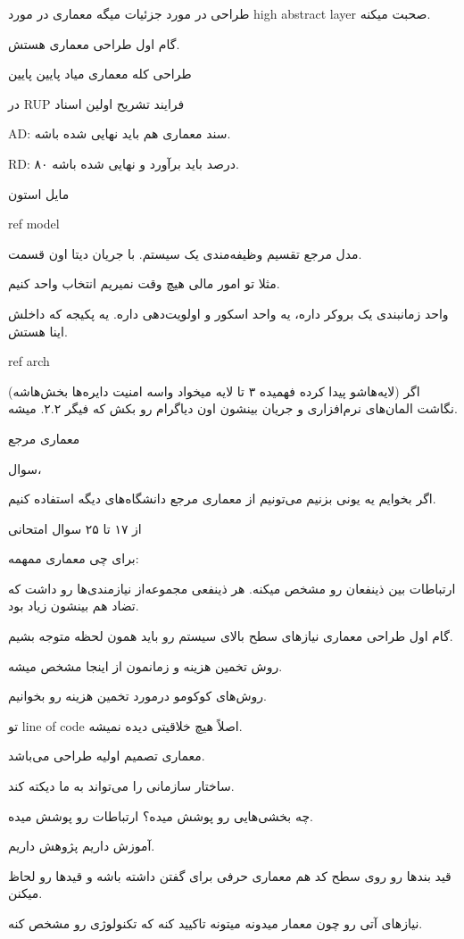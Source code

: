 طراحی در مورد جزئیات میگه
معماری در مورد high abstract layer صحبت میکنه.

گام اول طراحی معماری هستش.

طراحی کله معماری میاد پایین پایین

در RUP فرایند تشریح اولین اسناد

AD: سند معماری هم باید نهایی شده باشه.

RD: ۸۰ درصد باید برآورد و نهایی شده باشه.

مایل استون

ref model 

مدل مرجع تقسیم وظیفه‌مندی یک سیستم. با جریان دیتا اون قسمت.

مثلا تو امور مالی هیچ وقت نمیریم انتخاب واحد کنیم.

واحد زمانبندی یک بروکر داره، یه واحد اسکور و اولویت‌دهی داره. یه پکیجه که داخلش
اینا هستش.

ref arch

اگر (لایه‌هاشو پیدا کرده فهمیده ۳ تا لایه میخواد واسه امنیت دایره‌ها بخش‌هاشه)
نگاشت المان‌های نرم‌افزاری و جریان بینشون اون دیاگرام رو بکش که فیگر ۲.۲. میشه.

معماری مرجع

سوال،

اگر بخوایم یه یونی بزنیم می‌تونیم از معماری مرجع دانشگاه‌های دیگه استفاده کنیم.

از ۱۷ تا ۲۵ سوال امتحانی

برای چی معماری ممهمه:

ارتباطات بین ذینفعان رو مشخص میکنه. هر ذینفعی مجموعه‌از نیازمندی‌ها رو داشت که
تضاد هم بینشون زیاد بود.

گام اول طراحی معماری نیاز‌های سطح بالای سیستم رو باید همون لحظه متوجه بشیم.

روش تخمین هزینه و زمانمون از اینجا مشخص میشه.

روش‌های کوکومو درمورد تخمین هزینه رو بخوانیم.

تو line of code اصلاً هیچ خلاقیتی دیده نمیشه.

معماری تصمیم اولیه طراحی می‌باشد.

ساختار سازمانی را می‌تواند به ما دیکته کند.

چه بخشی‌هایی رو پوشش میده؟ ارتباطات رو پوشش میده.

آموزش داریم پژوهش داریم.

قید بند‌ها رو روی سطح کد هم معماری حرفی برای گفتن داشته باشه و قید‌ها رو لحاظ
میکنن.

نیاز‌های آتی رو چون معمار میدونه میتونه تاکیید کنه که تکنولوژی رو مشخص کنه.

